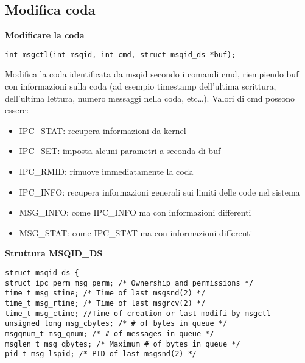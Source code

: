 \begin{flushleft}
  \subsection{Modifica coda}
  \begin{flushleft}
    \textbf{Modificare la coda}\par 
    \begin{flushleft}
      \texttt{int msgctl(int msqid, int cmd, struct msqid\_ds *buf);}
    \end{flushleft}
    Modifica la coda identificata da msqid secondo i comandi cmd, riempiendo buf con 
    informazioni sulla coda (ad esempio timestamp dell'ultima scrittura, dell'ultima 
    lettura, numero messaggi nella coda, etc…). Valori di cmd possono essere:
    \begin{itemize}
      \item IPC\_STAT: recupera informazioni da kernel 
      \item IPC\_SET: imposta alcuni parametri a seconda di buf
      \item IPC\_RMID: rimuove immediatamente la coda
      \item IPC\_INFO: recupera informazioni generali sui limiti delle code nel sistema
      \item MSG\_INFO: come IPC\_INFO ma con informazioni differenti
      \item MSG\_STAT: come IPC\_STAT ma con informazioni differenti
    \end{itemize}
    \begin{flushleft}
      \textbf{Struttura MSQID\_DS}\par 
      \texttt{struct msqid\_ds \{\\
              \halftab struct ipc\_perm msg\_perm; /* Ownership and permissions */\\
              \halftab time\_t msg\_stime; /* Time of last msgsnd(2) */\\
              \halftab time\_t msg\_rtime; /* Time of last msgrcv(2) */\\
              \halftab time\_t msg\_ctime; //Time of creation or last modifi by msgctl\\
              \halftab unsigned long msg\_cbytes; /* \# of bytes in queue */\\
              \halftab msgqnum\_t msg\_qnum; /* \# of messages in queue */\\
              \halftab msglen\_t msg\_qbytes; /* Maximum \# of bytes in queue */\\
              \halftab pid\_t msg\_lspid; /* PID of last msgsnd(2) */\\
}
\end{flushleft}
\end{flushleft}
\end{flushleft}
